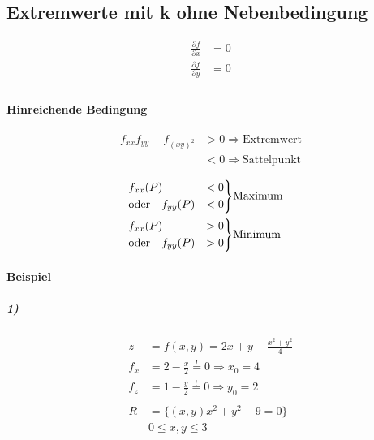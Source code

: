 \subsection{Extremwerte mit k ohne Nebenbedingung}

\begin{align*}
    \frac{\partial f}{\partial x} &= 0 \\
    \frac{\partial f}{\partial y} &= 0 \\
\end{align*}

\paragraph{Hinreichende Bedingung}


\begin{align*}
    f_{xx} f_{yy} - f_{(xy)^2} &> 0 \Rightarrow \text{Extremwert} \\
    &< 0 \Rightarrow \text{Sattelpunkt}
\end{align*}

\begin{align*}
    \begin{rcases}
        f_{xx} (P) &< 0 \\
        \text{oder}\quad f_{yy} (P) &< 0
    \end{rcases}
    &\text{Maximum} \\
    \begin{rcases}
        f_{xx} (P) &> 0 \\
        \text{oder}\quad f_{yy} (P) &> 0
    \end{rcases}
    &\text{Minimum}
\end{align*}

\paragraph{Beispiel}

\subparagraph{1)}

\begin{align*}
    z &= f(x, y) = 2x + y - \frac{x^2 + y^2}{4} \\
    f_x &= 2 - \frac{x}{2} \overset{!}{=} 0 \Rightarrow x_0 = 4 \\
    f_z &= 1 - \frac{y}{2} \overset{!}{=} 0 \Rightarrow y_0 = 2 \\
    \\
    R &= \{ (x, y) x^2 + y^2 - 9 = 0 \} \\
    & 0 \leq x, y \leq 3
\end{align*}

